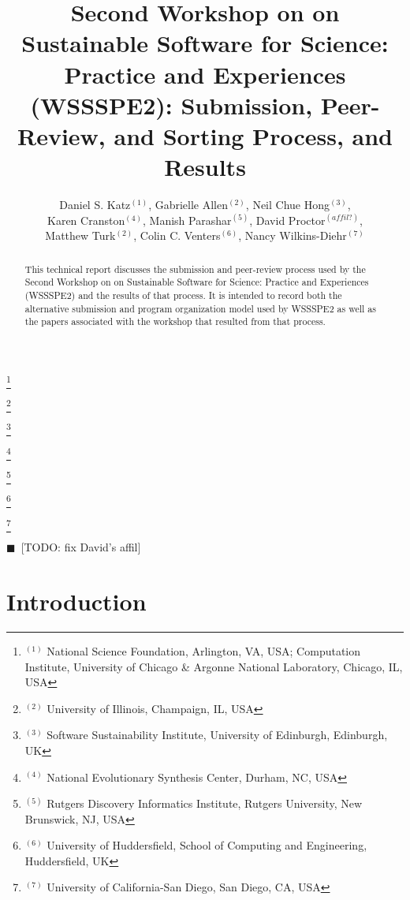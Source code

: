\documentclass[11pt, oneside]{amsart}
\newcommand{\todo}[1]{{\color{blue}$\blacksquare$~\textsf{[TODO: #1]}}}
\begin{document}
\title[]{Second Workshop on on Sustainable Software for Science: Practice and Experiences (WSSSPE2): Submission, Peer-Review, and Sorting Process, and Results}

\author{Daniel S. Katz$^{(1)}$, Gabrielle Allen$^{(2)}$, Neil Chue Hong$^{(3)}$, \\
Karen Cranston$^{(4)}$, Manish Parashar$^{(5)}$, David Proctor$^{(affil?)}$, \\
Matthew Turk$^{(2)}$, Colin C. Venters$^{(6)}$, Nancy Wilkins-Diehr$^{(7)}$}


\thanks{{}$^{(1)}$ National Science Foundation, Arlington, VA, USA; Computation Institute, University of Chicago \& Argonne National Laboratory, Chicago, IL, USA}

\thanks{{}$^{(2)}$ University of Illinois, Champaign, IL, USA}


\thanks{{}$^{(3)}$ Software Sustainability Institute, University of Edinburgh, Edinburgh, UK}
  
\thanks{{}$^{(4)}$ National Evolutionary Synthesis Center, Durham, NC, USA}

\thanks{{}$^{(5)}$ Rutgers Discovery Informatics Institute, Rutgers University, New Brunswick, NJ, USA}

\thanks{{}$^{(6)}$ University of Huddersfield, School of Computing and Engineering, Huddersfield, UK}

\thanks{{}$^{(7)}$ University of California-San Diego, San Diego, CA, USA}


    
\begin{abstract}
This technical report discusses the submission and peer-review process used by the Second Workshop on on Sustainable Software for Science: Practice and Experiences (WSSSPE2) and the results of that process.  It is intended to record both the alternative submission and program organization model used by WSSSPE2 as well as the papers associated with the workshop that resulted from that process.
\end{abstract}



\maketitle


\todo{fix David's affil}

\section{Introduction}
\end{document}
